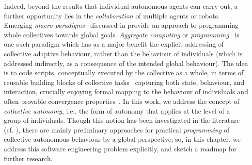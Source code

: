 Indeed, beyond the results that individual autonomous agents 
 can carry out, a further opportunity lies in the \emph{collaboration}
 of multiple agents or robots.
%
Emerging \emph{macro-paradigms}~\cite{DBLP:journals/corr/abs-1202-5509,viroli2019jlamp-si-coord}
 discussed in 
 provide an approach to programming whole collectives
 towards global goals.
%
\emph{Aggregate computing} or \emph{programming}~\cite{DBLP:journals/computer/BealPV15,viroli2019jlamp-si-coord} is one such paradigm 
which has as a major benefit the explicit addressing of collective adaptive behaviour, rather than the behaviour of individuals (which is addressed indirectly, as a consequence of the intended global behaviour).
%
The idea is to code scripts, conceptually executed by the collective as a whole, in terms of reusable building blocks of collective tasks~\cite{DBLP:conf/saso/BealV14a}
 capturing both state, behaviour, and interaction,
 crucially enjoying formal mapping to the behaviour of individuals
 and often provable convergence properties~\cite{viroli2019jlamp-si-coord,DBLP:journals/tomacs/ViroliABDP18}.
%
%
In this work, we address the concept of \emph{collective autonomy}, i.e., the form of autonomy that applies at the level of a group of individuals.
%
Though this notion has been investigated in the literature (cf. ), there are mainly preliminary approaches for practical \emph{programming} of collective autonomous behaviour by a global perspective; so, in this chapter, we address this software engineering problem explicitly, and sketch a roadmap for further research.
%
